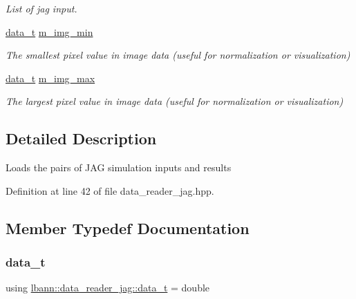 \begin{DoxyCompactItemize}
\begin{DoxyCompactList}\small\item\em List of jag input. \end{DoxyCompactList}\item 
\hyperlink{classlbann_1_1data__reader__jag_a7377d6c02c455f019a378489b9b8eab4}{data\+\_\+t} \hyperlink{classlbann_1_1data__reader__jag_a273907a834d9bd234b21f88ee72076be}{m\+\_\+img\+\_\+min}
\begin{DoxyCompactList}\small\item\em The smallest pixel value in image data (useful for normalization or visualization) \end{DoxyCompactList}\item 
\hyperlink{classlbann_1_1data__reader__jag_a7377d6c02c455f019a378489b9b8eab4}{data\+\_\+t} \hyperlink{classlbann_1_1data__reader__jag_ab71122303357978ff1de2e2c1d1ac0ed}{m\+\_\+img\+\_\+max}
\begin{DoxyCompactList}\small\item\em The largest pixel value in image data (useful for normalization or visualization) \end{DoxyCompactList}\end{DoxyCompactItemize}


\subsection{Detailed Description}
Loads the pairs of J\+AG simulation inputs and results 

Definition at line 42 of file data\+\_\+reader\+\_\+jag.\+hpp.



\subsection{Member Typedef Documentation}
\mbox{\label{classlbann_1_1data__reader__jag_a7377d6c02c455f019a378489b9b8eab4}} 
\subsubsection{\texorpdfstring{data\+\_\+t}{data\_t}}
{\footnotesize\ttfamily using \hyperlink{classlbann_1_1data__reader__jag_a7377d6c02c455f019a378489b9b8eab4}{lbann\+::data\+\_\+reader\+\_\+jag\+::data\+\_\+t} =  double}



